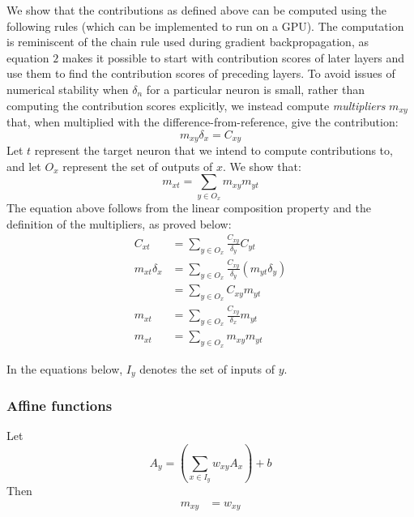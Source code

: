 \documentclass{article}
\begin{document}
We show that the contributions as defined above can be computed using the following rules (which can be implemented to run on a GPU). The computation is reminiscent of the chain rule used during gradient backpropagation, as equation $2$ makes it possible to start with contribution scores of later layers and use them to find the contribution scores of preceding layers. To avoid issues of numerical stability when $\delta_n$ for a particular neuron is small, rather than computing the contribution scores explicitly, we instead compute \emph{multipliers} $m_{xy}$ that, when multiplied with the difference-from-reference, give the contribution:
\begin{equation}
m_{xy} \delta_x = C_{xy}
\end{equation} 
Let $t$ represent the target neuron that we intend to compute contributions to, and let $O_x$ represent the set of outputs of $x$. We show that:
\begin{equation}
m_{xt} = \sum_{y \in O_x} m_{xy}m_{yt}
\end{equation} 
The equation above follows from the linear composition property and the definition of the multipliers, as proved below:
\begin{equation}
\begin{aligned}
C_{xt} &= \sum_{y \in O_x} \frac{C_{xy}}{\delta_y}C_{yt}\\
m_{xt} \delta_x &= \sum_{y \in O_x} \frac{C_{xy}}{\delta_y}(m_{yt} \delta_y)\\
                         &= \sum_{y \in O_x} C_{xy}m_{yt}\\
m_{xt} &= \sum_{y \in O_x} \frac{C_{xy}}{\delta_x}m_{yt}\\
m_{xt} &= \sum_{y \in O_x} m_{xy} m_{yt}
\end{aligned}
\end{equation} 

In the equations below, $I_y$ denotes the set of inputs of $y$.

\subsubsection{Affine functions}
Let
\begin{equation}
A_y = \left(\sum_{x \in I_y} w_{xy} A_x\right) + b  
\end{equation}
Then
\begin{equation}
\begin{aligned}
m_{xy} &= w_{xy}
\end{aligned}
\end{equation}
\end{document}
